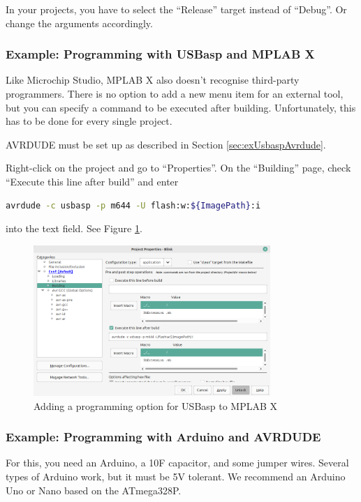 \documentclass{article}
\newenvironment{note}{\begin{tcolorbox}[colback=blue!5!white,colframe=blue!75!black,title=\textbf{Note}]}{\end{tcolorbox}}
\begin{document}
\begin{note}
In your projects, you have to select the ``Release'' target instead of ``Debug''. Or change the arguments accordingly. 
\end{note}

\FloatBarrier
\subsubsection{Example: Programming with USBasp and MPLAB X}\label{sec:exMPLABX}
Like Microchip Studio, MPLAB X also doesn't recognise third-party programmers. There is no option to add a new menu item for an external tool, but you can specify a command to be executed after building. Unfortunately, this has to be done for every single project. 

AVRDUDE must be set up as described in Section \ref{sec:exUsbaspAvrdude}. 

Right-click on the project and go to ``Properties''. On the ``Building'' page, check ``Execute this line after build'' and enter
\begin{lstlisting}[language=bash]
avrdude -c usbasp -p m644 -U flash:w:${ImagePath}:i
\end{lstlisting}
into the text field. See Figure \ref{fig:AvrdudeMPLABX}. 

\begin{figure}[htb]
\centering
\includegraphics[width=0.8\textwidth]{Pictures/AvrdudeMPLABX.png}
\caption{Adding a programming option for USBasp to MPLAB X}
\label{fig:AvrdudeMPLABX}
\end{figure}

\FloatBarrier
\subsubsection{Example: Programming with Arduino and AVRDUDE}\label{sec:exArduino}
For this, you need an Arduino, a 10\textmu F capacitor, and some jumper wires. Several types of Arduino work, but it must be 5V tolerant. We recommend an Arduino Uno or Nano based on the ATmega328P. 
\end{document}
